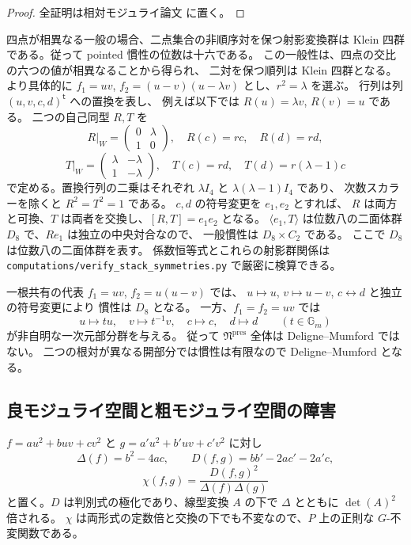 \begin{proof}
全証明は相対モジュライ論文 \cite[\texttt{noncubic_stack}]{QuadricModuli2026} に置く。
\end{proof}

\begin{example}
四点が相異なる一般の場合、二点集合の非順序対を保つ射影変換群は
Klein 四群である。従って pointed 慣性の位数は十六である。
この一般性は、四点の交比の六つの値が相異なることから得られ、
二対を保つ順列は Klein 四群となる。
より具体的に $f_1=uv$, $f_2=(u-v)(u-\lambda v)$ とし、$r^2=\lambda$ を選ぶ。
行列は列 $(u,v,c,d)^{\mathsf t}$ への置換を表し、
例えば以下では $R(u)=\lambda v$, $R(v)=u$ である。
二つの自己同型 $R,T$ を
\[
 R|_W=\begin{pmatrix}0&\lambda\\1&0\end{pmatrix},\quad
 R(c)=rc,\quad R(d)=rd,
\]
\[
 T|_W=\begin{pmatrix}\lambda&-\lambda\\1&-\lambda\end{pmatrix},\quad
 T(c)=rd,\quad T(d)=r(\lambda-1)c
\]
で定める。置換行列の二乗はそれぞれ $\lambda I_4$ と $\lambda(\lambda-1)I_4$ であり、
次数スカラーを除くと $R^2=T^2=1$ である。
$c,d$ の符号変更を $e_1,e_2$ とすれば、
$R$ は両方と可換、$T$ は両者を交換し、$[R,T]=e_1e_2$ となる。
$\langle e_1,T\rangle$ は位数八の二面体群 $D_8$ で、$Re_1$ は独立の中央対合なので、
一般慣性は $D_8\times C_2$ である。
ここで $D_8$ は位数八の二面体群を表す。
係数恒等式とこれらの射影群関係は
\texttt{computations/verify\_stack\_symmetries.py} で厳密に検算できる。

一根共有の代表 $f_1=uv$, $f_2=u(u-v)$ では、
$u\mapsto u$, $v\mapsto u-v$, $c\leftrightarrow d$ と独立の符号変更により
慣性は $D_8$ となる。
一方、$f_1=f_2=uv$ では
\[
 u\mapsto t u,\quad v\mapsto t^{-1}v,\quad c\mapsto c,\quad d\mapsto d
 \qquad(t\in\mathbb G_m)
\]
が非自明な一次元部分群を与える。
従って $\mathfrak N^{\mathrm{pres}}$ 全体は Deligne--Mumford ではない。
二つの根対が異なる開部分では慣性は有限なので Deligne--Mumford となる。
\end{example}

\subsection{良モジュライ空間と粗モジュライ空間の障害}
\label{subsec:noncubic-good-moduli}

$f=a u^2+buv+c v^2$ と $g=a'u^2+b'uv+c'v^2$ に対し
\[
 \Delta(f)=b^2-4ac,\qquad
 D(f,g)=bb'-2ac'-2a'c,
\]
\[
 \chi(f,g)=\frac{D(f,g)^2}{\Delta(f)\Delta(g)}
\]
と置く。$D$ は判別式の極化であり、線型変換 $A$ の下で
$\Delta$ とともに $\det(A)^2$ 倍される。
$\chi$ は両形式の定数倍と交換の下でも不変なので、$P$ 上の正則な $G$-不変関数である。

